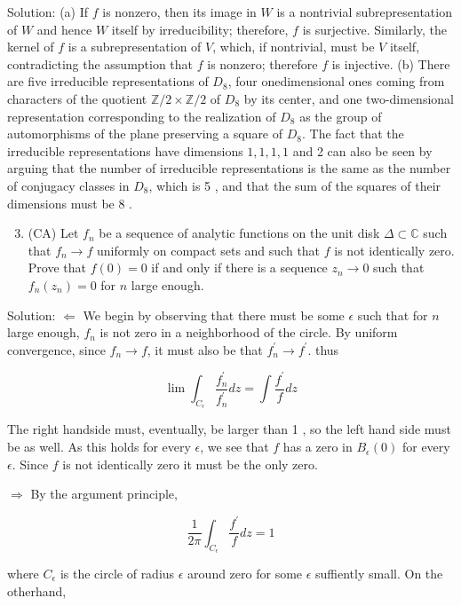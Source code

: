 \documentclass[10pt]{article}
\begin{document}
Solution: (a) If $f$ is nonzero, then its image in $W$ is a nontrivial subrepresentation of $W$ and hence $W$ itself by irreducibility; therefore, $f$ is surjective. Similarly, the kernel of $f$ is a subrepresentation of $V$, which, if nontrivial, must be $V$ itself, contradicting the assumption that $f$ is nonzero; therefore $f$ is injective. (b) There are five irreducible representations of $D_{8}$, four onedimensional ones coming from characters of the quotient $\mathbb{Z} / 2 \times \mathbb{Z} / 2$ of $D_{8}$ by its center, and one two-dimensional representation corresponding to the
realization of $D_{8}$ as the group of automorphisms of the plane preserving a square of $D_{8}$. The fact that the irreducible representations have dimensions $1,1,1,1$ and 2 can also be seen by arguing that the number of irreducible representations is the same as the number of conjugacy classes in $D_{8}$, which is 5 , and that the sum of the squares of their dimensions must be 8 .

\begin{enumerate}
  \setcounter{enumi}{2}
  \item (CA) Let $f_{n}$ be a sequence of analytic functions on the unit disk $\Delta \subset \mathbb{C}$ such that $f_{n} \rightarrow f$ uniformly on compact sets and such that $f$ is not identically zero. Prove that $f(0)=0$ if and only if there is a sequence $z_{n} \rightarrow 0$ such that $f_{n}\left(z_{n}\right)=0$ for $n$ large enough.
\end{enumerate}

Solution: $\Longleftarrow$ We begin by observing that there must be some $\epsilon$ such that for $n$ large enough, $f_{n}$ is not zero in a neighborhood of the circle. By uniform convergence, since $f_{n} \rightarrow f$, it must also be that $f_{n}^{\prime} \rightarrow f^{\prime}$. thus

$$
\lim \int_{C_{\epsilon}} \frac{f_{n}^{\prime}}{f_{n}^{\prime}} d z=\int \frac{f^{\prime}}{f} d z
$$

The right handside must, eventually, be larger than 1 , so the left hand side must be as well. As this holds for every $\epsilon$, we see that $f$ has a zero in $B_{\epsilon}(0)$ for every $\epsilon$. Since $f$ is not identically zero it must be the only zero.

$\Longrightarrow$ By the argument principle,

$$
\frac{1}{2 \pi} \int_{C_{\epsilon}} \frac{f^{\prime}}{f} d z=1
$$

where $C_{\epsilon}$ is the circle of radius $\epsilon$ around zero for some $\epsilon$ suffiently small. On the otherhand,
\end{document}
